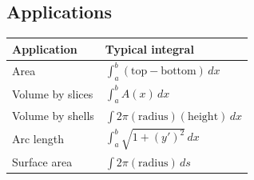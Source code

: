 \subsection*{Applications}

\begin{center}
\begin{tabular}{ll}
\toprule
Application & Typical integral \\
\midrule
Area & \(\int_a^b (\text{top}-\text{bottom})\,dx\) \\
Volume by slices & \(\int_a^b A(x)\,dx\) \\
Volume by shells & \(\int 2\pi(\text{radius})(\text{height})\,dx\) \\
Arc length & \(\int_a^b \sqrt{1+(y')^2}\,dx\) \\
Surface area & \(\int 2\pi(\text{radius})\,ds\) \\
\bottomrule
\end{tabular}
\end{center}
